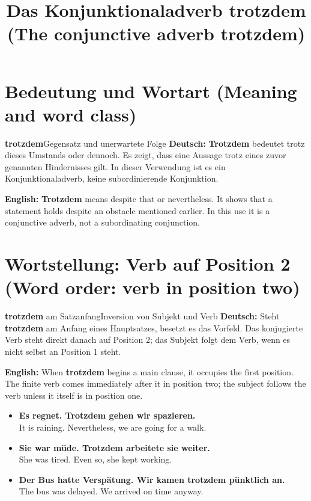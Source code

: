 \documentclass[a4paper,11pt]{article}
\title{Das Konjunktionaladverb \glqq trotzdem\grqq{} \textnormal{(The conjunctive adverb \glqq trotzdem\grqq)}}\date{}
\newcommand{\GermanText}[1]{\textbf{Deutsch: }#1\par}\newcommand{\EnglishText}[1]{{\small\color{SoftGray}\textbf{English: }#1\par}}\newcommand{\ExampleItem}[2]{\item \textbf{#1}\\{\small\color{SoftGray}#2}}
\begin{document}
\maketitle\tableofcontents\newpage
\section{Bedeutung und Wortart \textnormal{(Meaning and word class)}}
\begin{grammarentry}{\textbf{trotzdem}}{Gegensatz und unerwartete Folge}
\GermanText{\textbf{Trotzdem} bedeutet \glqq trotz dieses Umstands\grqq{} oder \glqq dennoch\grqq. Es zeigt, dass eine Aussage trotz eines zuvor genannten Hindernisses gilt. In dieser Verwendung ist es ein Konjunktionaladverb, keine subordinierende Konjunktion.}
\EnglishText{\textbf{Trotzdem} means \glqq despite that\grqq{} or \glqq nevertheless\grqq. It shows that a statement holds despite an obstacle mentioned earlier. In this use it is a conjunctive adverb, not a subordinating conjunction.}
\end{grammarentry}

\section{Wortstellung: Verb auf Position 2 \textnormal{(Word order: verb in position two)}}
\begin{grammarentry}{\textbf{trotzdem} am Satzanfang}{Inversion von Subjekt und Verb}
\GermanText{Steht \textbf{trotzdem} am Anfang eines Hauptsatzes, besetzt es das Vorfeld. Das konjugierte Verb steht direkt danach auf Position 2; das Subjekt folgt dem Verb, wenn es nicht selbst an Position 1 steht.}
\EnglishText{When \textbf{trotzdem} begins a main clause, it occupies the first position. The finite verb comes immediately after it in position two; the subject follows the verb unless it itself is in position one.}
\end{grammarentry}
\begin{exbox}\begin{itemize}
\ExampleItem{Es regnet. Trotzdem gehen wir spazieren.}{It is raining. Nevertheless, we are going for a walk.}
\ExampleItem{Sie war müde. Trotzdem arbeitete sie weiter.}{She was tired. Even so, she kept working.}
\ExampleItem{Der Bus hatte Verspätung. Wir kamen trotzdem pünktlich an.}{The bus was delayed. We arrived on time anyway.}
\end{itemize}\end{exbox}
\end{document}
